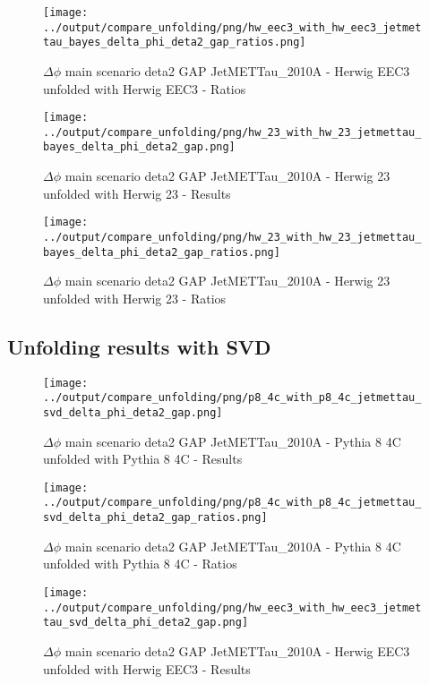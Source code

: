 \documentclass[11pt]{book}
\begin{document}
\begin{figure}[ht]
\centering
\texttt{[image: ../output/compare\_unfolding/png/hw\_eec3\_with\_hw\_eec3\_jetmettau\_bayes\_delta\_phi\_deta2\_gap\_ratios.png]}
\caption{$\Delta\phi$ main scenario deta2 GAP JetMETTau\_2010A - Herwig EEC3 unfolded with Herwig EEC3 - Ratios}
\label{hw_eec3_hw_eec3_jetmettau_bayes_delta_phi_deta2_gap_b}
\end{figure}

\begin{figure}[ht]
\centering
\texttt{[image: ../output/compare\_unfolding/png/hw\_23\_with\_hw\_23\_jetmettau\_bayes\_delta\_phi\_deta2\_gap.png]}
\caption{$\Delta\phi$ main scenario deta2 GAP JetMETTau\_2010A - Herwig 23 unfolded with Herwig 23 - Results}
\label{hw_23_hw_23_jetmettau_bayes_delta_phi_deta2_gap_a}
\end{figure}

\begin{figure}[ht]
\centering
\texttt{[image: ../output/compare\_unfolding/png/hw\_23\_with\_hw\_23\_jetmettau\_bayes\_delta\_phi\_deta2\_gap\_ratios.png]}
\caption{$\Delta\phi$ main scenario deta2 GAP JetMETTau\_2010A - Herwig 23 unfolded with Herwig 23 - Ratios}
\label{hw_23_hw_23_jetmettau_bayes_delta_phi_deta2_gap_b}
\end{figure}

\clearpage
\subsection{Unfolding results with SVD}

\begin{figure}[ht]
\centering
\texttt{[image: ../output/compare\_unfolding/png/p8\_4c\_with\_p8\_4c\_jetmettau\_svd\_delta\_phi\_deta2\_gap.png]}
\caption{$\Delta\phi$ main scenario deta2 GAP JetMETTau\_2010A - Pythia 8 4C unfolded with Pythia 8 4C - Results}
\label{p8_p8_jetmettau_svd_delta_phi_deta2_gap_a}
\end{figure}

\begin{figure}[ht]
\centering
\texttt{[image: ../output/compare\_unfolding/png/p8\_4c\_with\_p8\_4c\_jetmettau\_svd\_delta\_phi\_deta2\_gap\_ratios.png]}
\caption{$\Delta\phi$ main scenario deta2 GAP JetMETTau\_2010A - Pythia 8 4C unfolded with Pythia 8 4C - Ratios}
\label{p8_p8_jetmettau_svd_delta_phi_deta2_gap_b}
\end{figure}

\begin{figure}[ht]
\centering
\texttt{[image: ../output/compare\_unfolding/png/hw\_eec3\_with\_hw\_eec3\_jetmettau\_svd\_delta\_phi\_deta2\_gap.png]}
\caption{$\Delta\phi$ main scenario deta2 GAP JetMETTau\_2010A - Herwig EEC3 unfolded with Herwig EEC3 - Results}
\label{hw_eec3_hw_eec3_jetmettau_svd_delta_phi_deta2_gap_a}
\end{figure}
\end{document}
